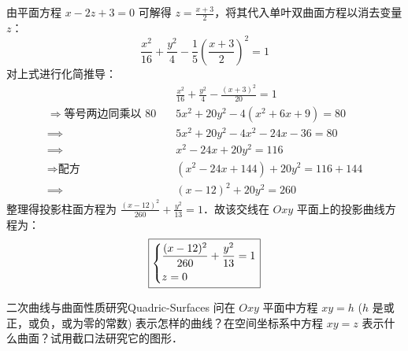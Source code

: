 \begin{solution}
    由平面方程 $x - 2z + 3 = 0$ 可解得 $z = \frac{x+3}{2}$，将其代入单叶双曲面方程以消去变量 $z$：
    \begin{equation}
        \frac{x^2}{16} + \frac{y^2}{4} - \frac{1}{5} \left( \frac{x+3}{2} \right)^2 = 1
    \end{equation}
    对上式进行化简推导：
    \begin{equation}
        \begin{aligned}
                                                      & \frac{x^2}{16} + \frac{y^2}{4} - \frac{(x+3)^2}{20} = 1 \\
            \Longrightarrow{\text{等号两边同乘以 } 80} \quad & 5x^2 + 20y^2 - 4(x^2 + 6x + 9) = 80                     \\
            \implies                                  & 5x^2 + 20y^2 - 4x^2 - 24x - 36 = 80                     \\
            \implies                                  & x^2 - 24x + 20y^2 = 116                                 \\
            \Longrightarrow{\text{配方}} \quad          & (x^2 - 24x + 144) + 20y^2 = 116 + 144                   \\
            \implies                                  & (x-12)^2 + 20y^2 = 260
        \end{aligned}
    \end{equation}
    整理得投影柱面方程为 $\frac{(x-12)^2}{260} + \frac{y^2}{13} = 1$．故该交线在 $Oxy$ 平面上的投影曲线方程为：
    \begin{equation}
        \boxed{\begin{dcases} \frac{(x-12)^2}{260} + \frac{y^2}{13} = 1 \\ z = 0 \end{dcases}}
    \end{equation}
\end{solution}


\begin{problem}{二次曲线与曲面性质研究}{Quadric-Surfaces}
    问在 $Oxy$ 平面中方程 $xy = h$ ($h$ 是或正，或负，或为零的常数) 表示怎样的曲线？在空间坐标系中方程 $xy = z$ 表示什么曲面？试用截口法研究它的图形．
\end{problem}

